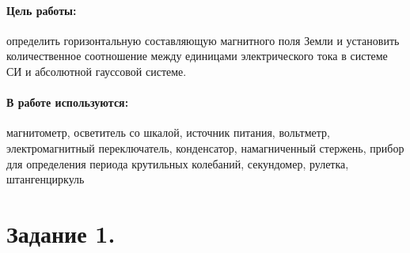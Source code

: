 \documentclass[a4paper, 12pt]{article}
\newenvironment{bottompar}{\par\vspace*{\fill}}{\clearpage}
\begin{document}
\begin{titlepage}
\begin{bottompar}
\end{bottompar}
\vfill %

\end{titlepage}

\paragraph{Цель работы:} определить горизонтальную составляющую магнитного поля Земли и установить количественное соотношение между единицами электрического тока в системе СИ и абсолютной гауссовой системе.
\paragraph{В работе используются:} магнитометр, осветитель со шкалой, источник питания, вольтметр, электромагнитный переключатель, конденсатор, намагниченный стержень, прибор для определения периода крутильных колебаний, секундомер, рулетка, штангенциркуль
\section*{Задание 1.}
\end{document}
